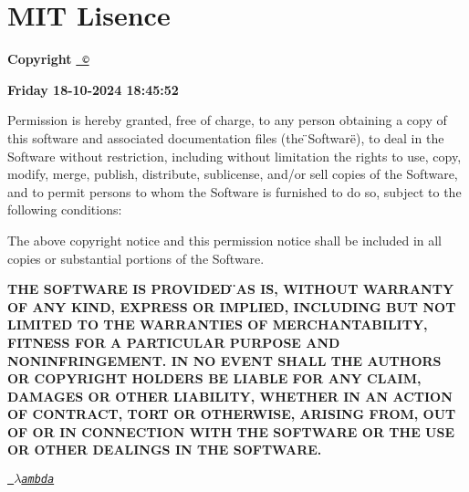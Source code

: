\chapter{MIT Lisence}
\hypertarget{md_release_2_project_2doc_2legal_2_l_i_s_e_n_c_e}{}\label{md_release_2_project_2doc_2legal_2_l_i_s_e_n_c_e}
{\bfseries{Copyright}} \href{https://en.wikipedia.org/wiki/Copyright_symbol}{\texttt{ \copyright{}}}

{\bfseries{Friday 18-\/10-\/2024 18\+:45\+:52}}

Permission is hereby granted, free of charge, to any person obtaining a copy of this software and associated documentation files (the \"{}\+Software\"{}), to deal in the Software without restriction, including without limitation the rights to use, copy, modify, merge, publish, distribute, sublicense, and/or sell copies of the Software, and to permit persons to whom the Software is furnished to do so, subject to the following conditions\+:

The above copyright notice and this permission notice shall be included in all copies or substantial portions of the Software.

{\bfseries{THE SOFTWARE IS PROVIDED \"{}\+AS IS\"{}, WITHOUT WARRANTY OF ANY KIND, EXPRESS OR IMPLIED, INCLUDING BUT NOT LIMITED TO THE WARRANTIES OF MERCHANTABILITY, FITNESS FOR A PARTICULAR PURPOSE AND NONINFRINGEMENT. IN NO EVENT SHALL THE AUTHORS OR COPYRIGHT HOLDERS BE LIABLE FOR ANY CLAIM, DAMAGES OR OTHER LIABILITY, WHETHER IN AN ACTION OF CONTRACT, TORT OR OTHERWISE, ARISING FROM, OUT OF OR IN CONNECTION WITH THE SOFTWARE OR THE USE OR OTHER DEALINGS IN THE SOFTWARE.}}

{\itshape \href{https://www.lambda.joburg}{\texttt{ {$\lambda$}ambda}}} 